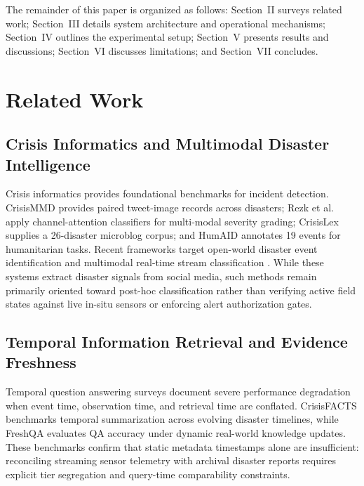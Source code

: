 \documentclass[conference]{IEEEtran}
\begin{document}
The remainder of this paper is organized as follows: Section~II surveys related work; Section~III details system architecture and operational mechanisms; Section~IV outlines the experimental setup; Section~V presents results and discussions; Section~VI discusses limitations; and Section~VII concludes.

\section{Related Work}
\subsection{Crisis Informatics and Multimodal Disaster Intelligence}
Crisis informatics provides foundational benchmarks for incident detection. CrisisMMD \cite{crisismmd} provides paired tweet-image records across disasters; Rezk et al.\ \cite{rezk2023} apply channel-attention classifiers for multi-modal severity grading; CrisisLex \cite{olteanu2014} supplies a 26-disaster microblog corpus; and HumAID \cite{humaid} annotates 19 events for humanitarian tasks. Recent frameworks target open-world disaster event identification \cite{yu2025} and multimodal real-time stream classification \cite{kim2025}. While these systems extract disaster signals from social media, such methods remain primarily oriented toward post-hoc classification rather than verifying active field states against live in-situ sensors or enforcing alert authorization gates.

\subsection{Temporal Information Retrieval and Evidence Freshness}
Temporal question answering surveys \cite{piryani2023} document severe performance degradation when event time, observation time, and retrieval time are conflated. CrisisFACTS \cite{crisisfacts} benchmarks temporal summarization across evolving disaster timelines, while FreshQA \cite{freshqa} evaluates QA accuracy under dynamic real-world knowledge updates. These benchmarks confirm that static metadata timestamps alone are insufficient: reconciling streaming sensor telemetry with archival disaster reports requires explicit tier segregation and query-time comparability constraints.
\end{document}
